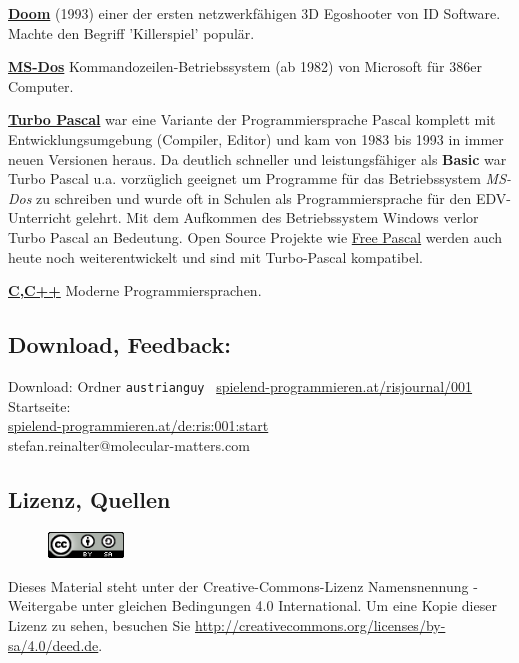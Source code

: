 \href{https://de.wikipedia.org/wiki/Doom}{\textbf{Doom}} (1993) einer der ersten netzwerkfähigen 3D Egoshooter von ID Software. Machte den Begriff 'Killerspiel' populär.

\href{https://de.wikipedia.org/wiki/MS_DOS}{\textbf{MS-Dos}} Kommandozeilen-Betriebssystem (ab 1982) von Microsoft für 386er Computer. 

\href{https://de.wikipedia.org/wiki/Turbo_Pascal}{\textbf{Turbo Pascal}} war eine Variante der Programmiersprache Pascal komplett mit Entwicklungsumgebung (Compiler, Editor) und kam von 1983 bis 1993 in immer neuen Versionen heraus. Da deutlich schneller und leistungsfähiger als \textbf{Basic} war Turbo Pascal u.a. vorzüglich geeignet um Programme für das Betriebssystem \textit{MS-Dos} zu schreiben und wurde oft in Schulen als Programmiersprache für den EDV-Unterricht gelehrt. Mit dem Aufkommen des Betriebssystem Windows verlor Turbo Pascal an Bedeutung. Open Source Projekte wie \href{https://de.wikipedia.org/wiki/Free_Pascal}{Free Pascal} werden auch heute noch weiterentwickelt und sind mit  Turbo-Pascal kompatibel.

\href{https://de.wikipedia.org/wiki/C_(Programmiersprache)}{\textbf{C,C++}} Moderne Programmiersprachen.

\subsection*{Download, Feedback:}
\footnotesize{
Download: Ordner \texttt{austrianguy} \Mundus\ \href{http://spielend-programmieren.at/risjournal/001}{spielend-programmieren.at/risjournal/001}\\
Startseite:\\
\href{http://spielend-programmieren.at/de:ris:001:start}{spielend-programmieren.at/de:ris:001:start}\\ 
\Letter\: stefan.reinalter@molecular-matters.com\\}
\normalsize 

\subsection*{Lizenz, Quellen}
\begin{figure}
\includegraphics[width=2cm]{austrianguy/ccbysa88x31.png}
\end{figure}
Dieses Material steht unter der Creative-Commons-Lizenz Namensnennung - Weitergabe unter gleichen Bedingungen 4.0 International. Um eine Kopie dieser Lizenz zu sehen, besuchen Sie \url{http://creativecommons.org/licenses/by-sa/4.0/deed.de}.

